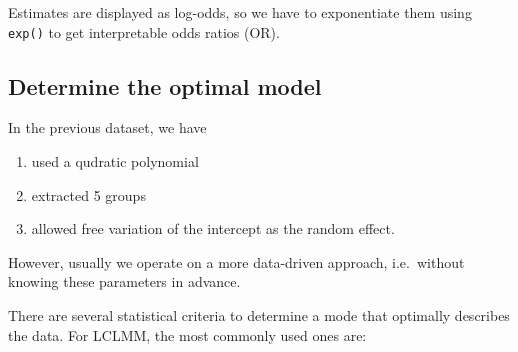 \documentclass[
]{book}
\providecommand{\tightlist}{%
  \setlength{\itemsep}{0pt}\setlength{\parskip}{0pt}}
\begin{document}
Estimates are displayed as log-odds, so we have to exponentiate them using \texttt{exp()} to get interpretable odds ratios (OR).

\hypertarget{determine-the-optimal-model}{%
\subsection{Determine the optimal model}\label{determine-the-optimal-model}}

In the previous dataset, we have

\begin{enumerate}
\def\labelenumi{\arabic{enumi}.}
\tightlist
\item
  used a qudratic polynomial
\item
  extracted 5 groups
\item
  allowed free variation of the intercept as the random effect.
\end{enumerate}

However, usually we operate on a more data-driven approach, i.e.~without knowing these parameters in advance.

There are several statistical criteria to determine a mode that optimally describes the data. For LCLMM, the most commonly used ones are:
\end{document}

